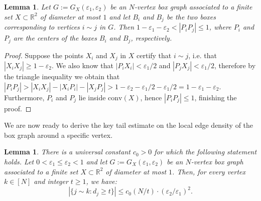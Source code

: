 \documentclass[12pt]{article}
\newtheorem{lem}[thm]{Lemma}
\newcommand{\eps}{\varepsilon}
\begin{document}
\begin{lem}\label{box-point}
    Let $G:=G_X(\varepsilon_1,\varepsilon_2)$ be an $N$-vertex box graph associated to a finite set $X\subset \mathbb{R}^2$ of diameter at most $1$ and let $B_i$ and $B_j$ be the two boxes corresponding to vertices $i\sim j$ in $G$. Then $1-\eps_1-\eps_2< |P_iP_j|\leq 1$, where $P_i$ and $P_j$ are the centers of the boxes $B_i$ and $B_j$, respectively. 
\end{lem}

\begin{proof}
    Suppose the points $X_i$ and $X_j$ in $X$ certify that $i\sim j$, i.e. that $|X_iX_j|\geq 1-\eps_2$. We also know that $|P_iX_i|<\eps_1/2$ and $|P_jX_j|<\eps_1/2$, therefore by the triangle inequality we obtain that $|P_iP_j|>|X_iX_j|-|X_iP_i|-|X_jP_j|>1-\eps_2-\eps_1/2-\eps_1/2=1-\eps_1-\eps_2$. Furthermore, $P_i$ and $P_j$ lie inside $\text{conv}(X)$, hence $|P_iP_j|\leq 1$, finishing the proof.
\end{proof}

We are now ready to derive the key tail estimate on the local edge density of the box graph around a specific vertex.

\begin{lem}\label{lem:tails}
There is a universal constant $c_0>0$ for which the following statement holds. 
Let $0<\eps_1\leq \eps_2<1$ and let $G:=G_X(\eps_1,\eps_2)$ be an $N$-vertex box graph associated to a finite set $X\subset \mathbb{R}^2$ of diameter at most $1$. Then, for every vertex $k\in [N]$ and integer $t\ge 1$, we have:
\[
|\{j\sim k: d_j\ge t\}|\le c_0(N/t)\cdot (\eps_2/\eps_1)^2.
\]
\end{lem}
\end{document}
